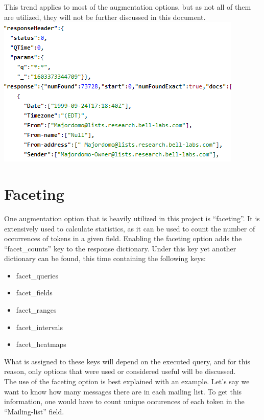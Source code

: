 \documentclass[a4paper,english]{report}
\begin{document}
This trend applies to most of the augmentation options, but as not all of them are utilized, they will not be further discussed in this document. \\


\includegraphics{gui3}

\section{Faceting}

One augmentation option that is heavily utilized in this project is “faceting”. It is extensively used to calculate statistics, as it can be used to count the number of occurrences of tokens in a given field.
Enabling the faceting option adds the “facet\_counts” key to the response dictionary.
Under this key yet another dictionary can be found, this time containing the following keys:

\begin{itemize}

\item facet\_queries
\item facet\_fields
\item facet\_ranges
\item facet\_intervals
\item facet\_heatmaps

\end{itemize}

What is assigned to these keys will depend on the executed query, and for this reason, only options that were used or considered useful will be discussed.\\

The use of the faceting option is best explained with an example.
Let's say we want to know how many messages there are in each mailing list.
To get this information, one would have to count unique occurences of each token in the “Mailing-list” field.\\
\end{document}
